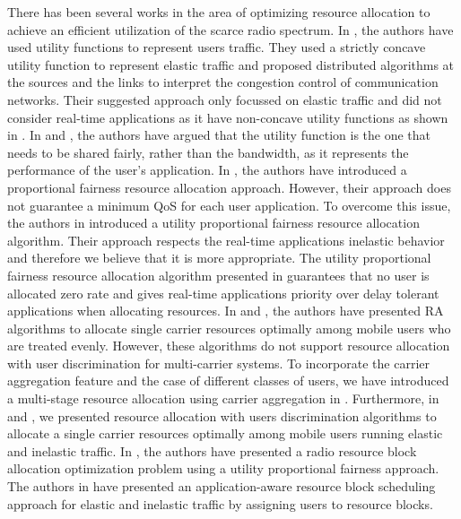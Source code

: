 \documentclass[journal]{IEEEtran} 				\IEEEoverridecommandlockouts 						\usepackage{amsmath,amssymb}
\begin{document}
There has been several works in the area of optimizing resource allocation to achieve an efficient utilization of the scarce radio spectrum. In \cite{kelly98ratecontrol,Internet_Congestion,Optimization_flow,Fair_endtoend}, the authors have used utility functions to represent users traffic. They used a strictly concave utility function to represent elastic traffic and proposed distributed algorithms at the sources and the links to interpret the congestion control of communication networks. Their suggested approach only focussed on elastic traffic and did not consider real-time applications as it have non-concave utility functions as shown in \cite{fundamental_design}. In \cite{Utility_max-min} and \cite{ Fair_allocation}, the authors have argued that the utility function is the one that needs to be shared fairly, rather than the bandwidth, as it represents the performance of the user's application.
In \cite{kelly98ratecontrol}, the authors have introduced a proportional fairness resource allocation approach. However, their approach does not guarantee a minimum QoS for each user application. To overcome this issue, the authors in \cite{Ahmed_Utility1} introduced a utility proportional fairness resource allocation algorithm. Their approach respects the real-time applications inelastic behavior and therefore we believe that it is more appropriate. The utility proportional fairness resource allocation algorithm presented in \cite{Ahmed_Utility1} guarantees that no user is allocated zero rate and gives real-time applications priority over delay tolerant applications when allocating resources. In \cite{Ahmed_Utility1, Ahmed_Utility2} and \cite{ Ahmed_Utility3}, the authors have presented RA algorithms to allocate single carrier resources optimally among mobile users who are treated evenly. However, these algorithms do not support resource allocation with user discrimination for multi-carrier systems. To incorporate the carrier aggregation feature and the case of different classes of users, we have introduced a multi-stage resource allocation using carrier aggregation in \cite{Haya_Utility1}. Furthermore, in \cite{Haya_Utility2} and \cite{Haya_Utility4}, we presented resource allocation with users discrimination algorithms to allocate a single carrier resources optimally among mobile users running elastic and inelastic traffic. In \cite{Mo_ResourceBlock}, the authors have presented a radio resource block allocation optimization problem using a utility proportional fairness approach. The authors in \cite{Tugba_ApplicationAware} have presented an application-aware resource block scheduling approach for elastic and inelastic traffic by assigning users to resource blocks.
\end{document}
